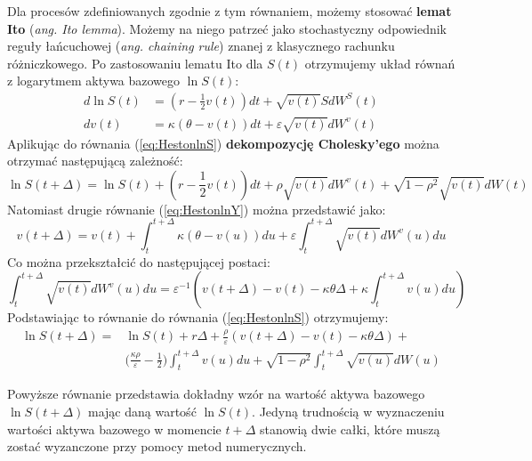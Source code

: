 \documentclass{pracamgr}
\begin{document}
Dla procesów zdefiniowanych zgodnie z tym równaniem, możemy 
stosować \textbf{lemat Ito} (\textit{ang. Ito lemma}). Możemy na niego patrzeć 
jako stochastyczny odpowiednik reguły łańcuchowej (\textit{ang. chaining rule}) znanej z 
klasycznego rachunku różniczkowego. 
Po zastosowaniu lematu Ito dla $S(t)$ otrzymujemy układ równań z logarytmem aktywa bazowego $\ln S(t)$:
\begin{subequations}
\begin{align}
d \ln S(t) &= \left( r - \frac{1}{2} v(t) \right) dt 
              + \sqrt{v(t)} SdW^S(t) \label{eq:HestonlnS} \\
dv(t)      &= \kappa (\theta - v(t))dt + \varepsilon 
              \sqrt{v(t)} dW^v(t)  \label{eq:HestonlnY}
\end{align} 
\end{subequations}
Aplikując do równania (\ref{eq:HestonlnS}) \textbf{dekompozycję Cholesky'ego} można
otrzymać następującą zależność:
\begin{equation}
  \ln S(t + \Delta) = \ln S(t) + \left( r - \frac{1}{2} v(t) \right) dt 
              + \rho \sqrt{v(t)} dW^v(t) + \sqrt{1 - \rho^2} \sqrt{v(t)} dW(t)
\end{equation}
Natomiast drugie równanie (\ref{eq:HestonlnY}) można przedstawić jako:
\begin{equation}
  v(t + \Delta)      = v(t) + \int_t^{t+\Delta} \kappa 
                        (\theta - v(u))du + \varepsilon 
                        \int_t^{t+\Delta}  \sqrt{v(t)} dW^v(u) du 
\end{equation}
Co można przekształcić do następującej postaci:
\begin{equation}
  \int_t^{t+\Delta}  \sqrt{v(t)} dW^v(u) du  = \varepsilon^{-1} \left(v(t+\Delta) 
  - v(t) - \kappa \theta \Delta + \kappa \int_t^{t+\Delta}  v(u) du \right)
\end{equation}
Podstawiając to równanie do równania (\ref{eq:HestonlnS}) otrzymujemy:
\begin{equation}
\begin{aligned}
\label{eq:HestonLnSDiscretization}
\ln S(t + \Delta) = & \ln S(t) + r \Delta + \frac{\rho}{\varepsilon} (v(t + \Delta)  - v(t) - \kappa \theta \Delta) + \\
& \Big( \frac{\kappa \rho}{\varepsilon} - \frac{1}{2} \Big)
\int_t^{t+\Delta} v(u) du + \sqrt{1-\rho^2} \int_t^{t+\Delta} \sqrt{v(u)}dW(u)
\end{aligned}
\end{equation}

Powyższe równanie przedstawia dokładny wzór na wartość aktywa 
bazowego $\ln S(t + \Delta) $ mając daną wartość $\ln S(t)$.
Jedyną trudnością w wyznaczeniu wartości aktywa bazowego w momencie
$t + \Delta$ stanowią dwie całki, które muszą zostać wyzanczone przy 
pomocy metod numerycznych. 
\end{document}
